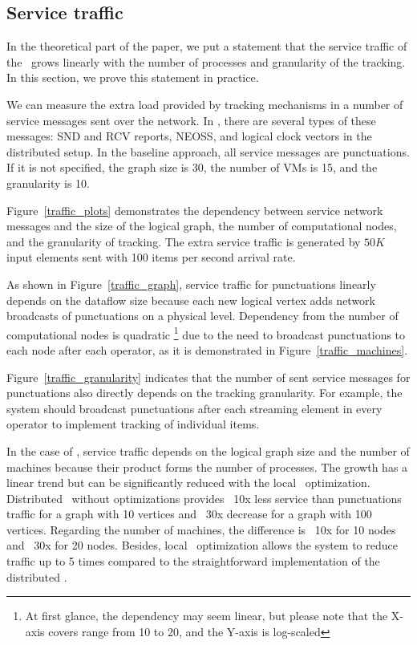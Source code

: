 \subsection{Service traffic}
\label{exp_network_traffic}
In the theoretical part of the paper, we put a statement that the service traffic of the \tracker\ grows linearly with the number of processes and granularity of the tracking. In this section, we prove this statement in practice. 

We can measure the extra load provided by tracking mechanisms in a number of service messages sent over the network. In \tracker, there are several types of these messages: SND and RCV reports, NEOSS, and logical clock vectors in the distributed setup. In the baseline approach, all service messages are punctuations. If it is not specified, the graph size is 30, the number of VMs is 15, and the granularity is 10.

Figure~\ref{traffic_plots} demonstrates the dependency between service network messages and the size of the logical graph, the number of computational nodes, and the granularity of tracking. The extra service traffic is generated by $50K$ input elements sent with 100 items per second arrival rate. 

As shown in Figure~\ref{traffic_graph}, service traffic for punctuations linearly depends on the dataflow size because each new logical vertex adds network broadcasts of punctuations on a physical level. Dependency from the number of computational nodes is quadratic \footnote{At first glance, the dependency may seem linear, but please note that the X-axis covers range from 10 to 20, and the Y-axis is log-scaled} due to the need to broadcast punctuations to each node after each operator, as it is demonstrated in Figure~\ref{traffic_machines}. 

Figure~\ref{traffic_granularity} indicates that the number of sent service messages for punctuations also directly depends on the tracking granularity. For example, the system should broadcast punctuations after each streaming element in every operator to implement tracking of individual items. 

In the case of \tracker, service traffic depends on the logical graph size and the number of machines because their product forms the number of processes. The growth has a linear trend but can be significantly reduced with the local \tracker\ optimization. Distributed \tracker\ without optimizations provides ~10x less service than punctuations traffic for a graph with 10 vertices and ~30x decrease for a graph with 100 vertices. Regarding the number of machines, the difference is ~10x for 10 nodes and ~30x for 20 nodes. Besides, local \tracker\ optimization allows the system to reduce traffic up to 5 times compared to the straightforward implementation of the distributed \tracker.

